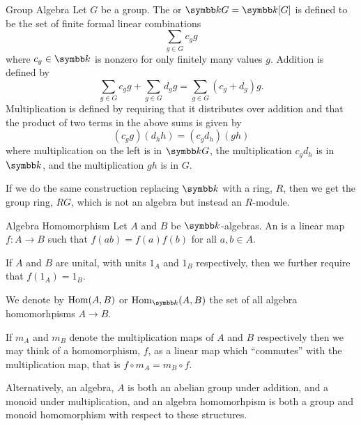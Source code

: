 \begin{dfn}{Group Algebra}{}
    Let \(G\) be a group.
    The  or  \(\field G = \field[G]\) is defined to be the set of finite formal linear combinations
    \begin{equation}
        \sum_{g \in G} c_g g
    \end{equation}    
    where \(c_g \in \field\) is nonzero for only finitely many values \(g\).
    Addition is defined by
    \begin{equation}
        \sum_{g \in G} c_g g + \sum_{g \in G} d_g g = \sum_{g \in G} (c_g + d_g) g.
    \end{equation}
    Multiplication is defined by requiring that it distributes over addition and that the product of two terms in the above sums is given by
    \begin{equation}
        (c_g g) (d_h h) = (c_g d_h) (gh)
    \end{equation}
    where multiplication on the left is in \(\field G\), the multiplication \(c_g d_h\) is in \(\field\), and the multiplication \(gh\) is in \(G\).
    
    If we do the same construction replacing \(\field\) with a ring, \(R\), then we get the group ring, \(RG\), which is not an algebra but instead an \(R\)-module.
\end{dfn}

\begin{dfn}{Algebra Homomorphism}{}
    Let \(A\) and \(B\) be \(\field\)-algebras.
    An  is a linear map \(f \colon A \to B\) such that \(f(ab) = f(a)f(b)\) for all \(a, b \in A\).
    
    If \(A\) and \(B\) are unital, with units \(1_A\) and \(1_B\) respectively, then we further require that \(f(1_A) = 1_B\).
    
    We denote by \(\operatorname{Hom}(A, B)\) or \(\Hom_{\field}(A, B)\) the set of all algebra homomorhpisms \(A \to B\).
\end{dfn}

If \(m_A\) and \(m_B\) denote the multiplication maps of \(A\) and \(B\) respectively then we may think of a homomorphism, \(f\), as a linear map which \enquote{commutes} with the multiplication map, that is \(f \circ m_A = m_B \circ f\).

Alternatively, an algebra, \(A\) is both an abelian group under addition, and a monoid under multiplication, and an algebra homomorhpism is both a group and monoid homomorphism with respect to these structures.

